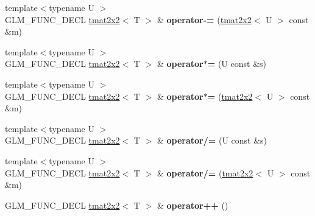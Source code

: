 \begin{DoxyCompactItemize}
\item 
\hypertarget{structglm_1_1detail_1_1tmat2x2_aa595ffa2296312bbb109af5c5701fd9d}{{\footnotesize template$<$typename U $>$ }\\G\-L\-M\-\_\-\-F\-U\-N\-C\-\_\-\-D\-E\-C\-L \hyperlink{structglm_1_1detail_1_1tmat2x2}{tmat2x2}$<$ T $>$ \& {\bfseries operator-\/=} (\hyperlink{structglm_1_1detail_1_1tmat2x2}{tmat2x2}$<$ U $>$ const \&m)}\label{structglm_1_1detail_1_1tmat2x2_aa595ffa2296312bbb109af5c5701fd9d}

\item 
\hypertarget{structglm_1_1detail_1_1tmat2x2_a33a00a31a0c777b09143cef2f1bd6a52}{{\footnotesize template$<$typename U $>$ }\\G\-L\-M\-\_\-\-F\-U\-N\-C\-\_\-\-D\-E\-C\-L \hyperlink{structglm_1_1detail_1_1tmat2x2}{tmat2x2}$<$ T $>$ \& {\bfseries operator$\ast$=} (U const \&s)}\label{structglm_1_1detail_1_1tmat2x2_a33a00a31a0c777b09143cef2f1bd6a52}

\item 
\hypertarget{structglm_1_1detail_1_1tmat2x2_a2c7a033623107e6feb21bb3b51913377}{{\footnotesize template$<$typename U $>$ }\\G\-L\-M\-\_\-\-F\-U\-N\-C\-\_\-\-D\-E\-C\-L \hyperlink{structglm_1_1detail_1_1tmat2x2}{tmat2x2}$<$ T $>$ \& {\bfseries operator$\ast$=} (\hyperlink{structglm_1_1detail_1_1tmat2x2}{tmat2x2}$<$ U $>$ const \&m)}\label{structglm_1_1detail_1_1tmat2x2_a2c7a033623107e6feb21bb3b51913377}

\item 
\hypertarget{structglm_1_1detail_1_1tmat2x2_a37c08f89d47be0279f96489239fb20f8}{{\footnotesize template$<$typename U $>$ }\\G\-L\-M\-\_\-\-F\-U\-N\-C\-\_\-\-D\-E\-C\-L \hyperlink{structglm_1_1detail_1_1tmat2x2}{tmat2x2}$<$ T $>$ \& {\bfseries operator/=} (U const \&s)}\label{structglm_1_1detail_1_1tmat2x2_a37c08f89d47be0279f96489239fb20f8}

\item 
\hypertarget{structglm_1_1detail_1_1tmat2x2_a9aab21954e48429c64d062331d01a486}{{\footnotesize template$<$typename U $>$ }\\G\-L\-M\-\_\-\-F\-U\-N\-C\-\_\-\-D\-E\-C\-L \hyperlink{structglm_1_1detail_1_1tmat2x2}{tmat2x2}$<$ T $>$ \& {\bfseries operator/=} (\hyperlink{structglm_1_1detail_1_1tmat2x2}{tmat2x2}$<$ U $>$ const \&m)}\label{structglm_1_1detail_1_1tmat2x2_a9aab21954e48429c64d062331d01a486}

\item 
\hypertarget{structglm_1_1detail_1_1tmat2x2_a04457c562f83f2f5d34bc5fa574faa17}{G\-L\-M\-\_\-\-F\-U\-N\-C\-\_\-\-D\-E\-C\-L \hyperlink{structglm_1_1detail_1_1tmat2x2}{tmat2x2}$<$ T $>$ \& {\bfseries operator++} ()}\label{structglm_1_1detail_1_1tmat2x2_a04457c562f83f2f5d34bc5fa574faa17}


\end{DoxyCompactItemize}
